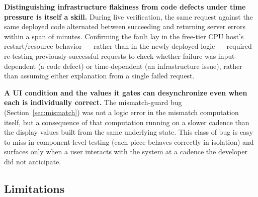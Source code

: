 \documentclass[conference]{IEEEtran}
\begin{document}
\textbf{Distinguishing infrastructure flakiness from code defects under time
pressure is itself a skill.} During live verification, the same request
against the same deployed code alternated between succeeding and returning
server errors within a span of minutes. Confirming the fault lay in the
free-tier CPU host's restart/resource behavior --- rather than in the newly
deployed logic --- required re-testing previously-successful requests to check
whether failure was input-dependent (a code defect) or time-dependent
(an infrastructure issue), rather than assuming either explanation from a
single failed request.

\textbf{A UI condition and the values it gates can desynchronize even when each
is individually correct.} The mismatch-guard bug (Section~\ref{sec:mismatch})
was not a logic error in the mismatch computation itself, but a consequence of
that computation running on a slower cadence than the display values built
from the same underlying state. This class of bug is easy to miss in
component-level testing (each piece behaves correctly in isolation) and
surfaces only when a user interacts with the system at a cadence the developer
did not anticipate.

\subsection{Limitations}
\label{sec:limitations}
\end{document}
